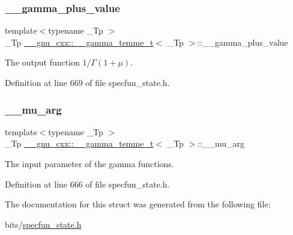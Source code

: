\subsubsection{\texorpdfstring{\+\_\+\+\_\+gamma\+\_\+plus\+\_\+value}{\_\_gamma\_plus\_value}}
{\footnotesize\ttfamily template$<$typename \+\_\+\+Tp $>$ \\
\+\_\+\+Tp \hyperlink{struct____gnu__cxx_1_1____gamma__temme__t}{\+\_\+\+\_\+gnu\+\_\+cxx\+::\+\_\+\+\_\+gamma\+\_\+temme\+\_\+t}$<$ \+\_\+\+Tp $>$\+::\+\_\+\+\_\+gamma\+\_\+plus\+\_\+value}



The output function $ 1/\Gamma(1 + \mu) $. 



Definition at line 669 of file specfun\+\_\+state.\+h.

\mbox{\label{struct____gnu__cxx_1_1____gamma__temme__t_a841e7c549dd505de260018ddaa020565}} 
\subsubsection{\texorpdfstring{\+\_\+\+\_\+mu\+\_\+arg}{\_\_mu\_arg}}
{\footnotesize\ttfamily template$<$typename \+\_\+\+Tp $>$ \\
\+\_\+\+Tp \hyperlink{struct____gnu__cxx_1_1____gamma__temme__t}{\+\_\+\+\_\+gnu\+\_\+cxx\+::\+\_\+\+\_\+gamma\+\_\+temme\+\_\+t}$<$ \+\_\+\+Tp $>$\+::\+\_\+\+\_\+mu\+\_\+arg}



The input parameter of the gamma functions. 



Definition at line 666 of file specfun\+\_\+state.\+h.



The documentation for this struct was generated from the following file\+:\begin{DoxyCompactItemize}
\item 
bits/\hyperlink{specfun__state_8h}{specfun\+\_\+state.\+h}\end{DoxyCompactItemize}
